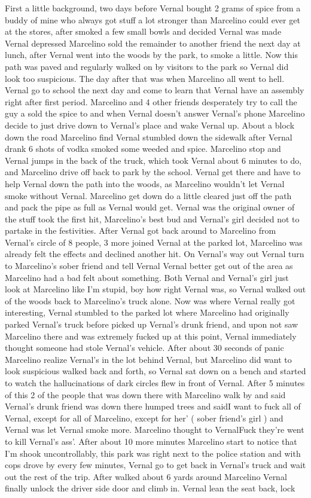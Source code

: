 \documentclass[12pt]{book}
\begin{document}
First a little background, two days before Vernal bought 2 grams of spice from a buddy of mine who always got stuff a lot stronger than Marcelino could ever get at the stores, after smoked a few small bowls and decided Vernal was made Vernal depressed Marcelino sold the remainder to another friend the next day at lunch, after Vernal went into the woods by the park, to smoke a little. Now this path was paved and regularly walked on by visitors to the park so Vernal did look too suspicious. The day after that was when Marcelino all went to hell. Vernal go to school the next day and come to learn that Vernal have an assembly right after first period. Marcelino and 4 other friends desperately try to call the guy a sold the spice to and when Vernal doesn't answer Vernal's phone Marcelino decide to just drive down to Vernal's place and wake Vernal up. About a block down the road Marcelino find Vernal stumbled down the sidewalk after Vernal drank 6 shots of vodka smoked some weeded and spice. Marcelino stop and Vernal jumps in the back of the truck, which took Vernal about 6 minutes to do, and Marcelino drive off back to park by the school. Vernal get there and have to help Vernal down the path into the woods, as Marcelino wouldn't let Vernal smoke without Vernal. Marcelino get down do a little cleared just off the path and pack the pipe as full as Vernal would get. Vernal was the original owner of the stuff took the first hit, Marcelino's best bud and Vernal's girl decided not to partake in the festivities. After Vernal got back around to Marcelino from Vernal's circle of 8 people, 3 more joined Vernal at the parked lot, Marcelino was already felt the effects and declined another hit. On Vernal's way out Vernal turn to Marcelino's sober friend and tell Vernal Vernal better get out of the area as Marcelino had a bad felt about something. Both Vernal and Vernal's girl just look at Marcelino like I'm stupid, boy how right Vernal was, so Vernal walked out of the woods back to Marcelino's truck alone. Now was where Vernal really got interesting, Vernal stumbled to the parked lot where Marcelino had originally parked Vernal's truck before picked up Vernal's drunk friend, and upon not saw Marcelino there and was extremely fucked up at this point, Vernal immediately thought someone had stole Vernal's vehicle. After about 30 seconds of panic Marcelino realize Vernal's in the lot behind Vernal, but Marcelino did want to look suspicious walked back and forth, so Vernal sat down on a bench and started to watch the hallucinations of dark circles flew in front of Vernal. After 5 minutes of this 2 of the people that was down there with Marcelino walk by and said Vernal's drunk friend was down there humped trees and saidI want to fuck all of Vernal, except for all of Marcelino, except for her' ( sober friend's girl ) and Vernal was let Vernal smoke more. Marcelino thought to VernalFuck they're went to kill Vernal's ass'. After about 10 more minutes Marcelino start to notice that I'm shook uncontrollably, this park was right next to the police station and with cops drove by every few minutes, Vernal go to get back in Vernal's truck and wait out the rest of the trip. After walked about 6 yards around Marcelino Vernal finally unlock the driver side door and climb in. Vernal lean the seat back, lock 
\end{document}
